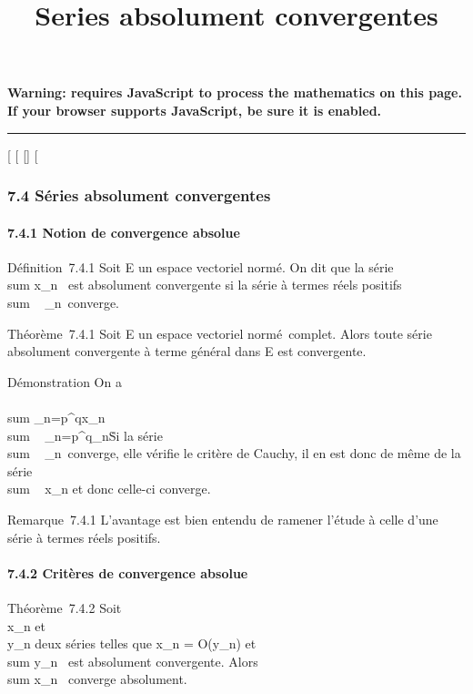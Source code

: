 \documentclass[]{article}
\title{Series absolument convergentes}
\author{}
\date{}
\begin{document}
\maketitle

\textbf{Warning: 
requires JavaScript to process the mathematics on this page.\\ If your
browser supports JavaScript, be sure it is enabled.}

\begin{center}\rule{3in}{0.4pt}\end{center}

{[}
{[}
{[}{]}
{[}

\subsubsection{7.4 Séries absolument convergentes}

\paragraph{7.4.1 Notion de convergence absolue}

Définition~7.4.1 Soit E un espace vectoriel normé. On dit que la série
\\sum  x_n~ est
absolument convergente si la série à termes réels positifs
\\sum ~
\x_n\
converge.

Théorème~7.4.1 Soit E un espace vectoriel normé~complet. Alors toute
série absolument convergente à terme général dans E est convergente.

Démonstration On a
\\\\sum
 _n=p^qx_n\
\leq\\sum ~
_n=p^q\x_n\.
Si la série \\sum ~
\x_n\
converge, elle vérifie le critère de Cauchy, il en est donc de même de
la série \\sum ~
x_n et donc celle-ci converge.

Remarque~7.4.1 L'avantage est bien entendu de ramener l'étude à celle
d'une série à termes réels positifs.

\paragraph{7.4.2 Critères de convergence absolue}

Théorème~7.4.2 Soit \\\sum
 x_n et \\\sum
 y_n deux séries telles que x_n = O(y_n)
et \\sum  y_n~
est absolument convergente. Alors
\\sum  x_n~
converge absolument.
\end{document}
